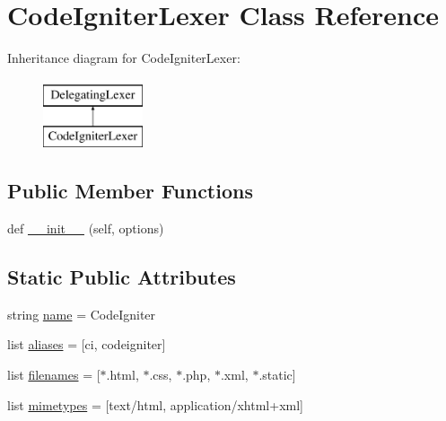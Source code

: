 \hypertarget{classcilexer_1_1cilexer_1_1_code_igniter_lexer}{}\section{Code\+Igniter\+Lexer Class Reference}
\label{classcilexer_1_1cilexer_1_1_code_igniter_lexer}
Inheritance diagram for Code\+Igniter\+Lexer\+:\begin{figure}[H]
\begin{center}
\leavevmode
\includegraphics[height=2.000000cm]{classcilexer_1_1cilexer_1_1_code_igniter_lexer}
\end{center}
\end{figure}
\subsection*{Public Member Functions}
\begin{DoxyCompactItemize}
\item 
def \hyperlink{classcilexer_1_1cilexer_1_1_code_igniter_lexer_a443fa007ebf0839724b1a1bbd8fad1d2}{\+\_\+\+\_\+init\+\_\+\+\_\+} (self, options)
\end{DoxyCompactItemize}
\subsection*{Static Public Attributes}
\begin{DoxyCompactItemize}
\item 
string \hyperlink{classcilexer_1_1cilexer_1_1_code_igniter_lexer_a8ccf841cb59e451791bcb2e1ac4f1edc}{name} = \textquotesingle{}Code\+Igniter\textquotesingle{}
\item 
list \hyperlink{classcilexer_1_1cilexer_1_1_code_igniter_lexer_a6633ea70ac603644121e6acd5dcca585}{aliases} = \mbox{[}\textquotesingle{}ci\textquotesingle{}, \textquotesingle{}codeigniter\textquotesingle{}\mbox{]}
\item 
list \hyperlink{classcilexer_1_1cilexer_1_1_code_igniter_lexer_ad63fcc40a3fb08841c9f0b5cee5741ee}{filenames} = \mbox{[}\textquotesingle{}$\ast$.html\textquotesingle{}, \textquotesingle{}$\ast$.css\textquotesingle{}, \textquotesingle{}$\ast$.php\textquotesingle{}, \textquotesingle{}$\ast$.xml\textquotesingle{}, \textquotesingle{}$\ast$.static\textquotesingle{}\mbox{]}
\item 
list \hyperlink{classcilexer_1_1cilexer_1_1_code_igniter_lexer_a580daf9337ffa2ec48c5c36585da00ed}{mimetypes} = \mbox{[}\textquotesingle{}text/html\textquotesingle{}, \textquotesingle{}application/xhtml+xml\textquotesingle{}\mbox{]}
\end{DoxyCompactItemize}


